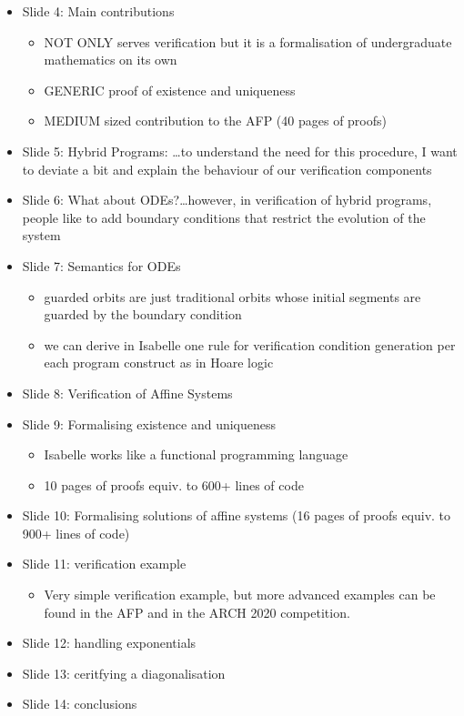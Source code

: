 \documentclass[english,letterpaper,12pt]{article}
\begin{document}
\begin{itemize}
\begin{itemize}
\end{itemize}
\item Slide 4: Main contributions
\begin{itemize}
\item NOT ONLY serves verification but it is a formalisation of undergraduate mathematics on its own 
\item GENERIC proof of existence and uniqueness
\item MEDIUM sized contribution to the AFP (40 pages of proofs)
\end{itemize}
\item Slide 5: Hybrid Programs: \dots to understand the need for this procedure, I want to deviate a bit and explain the behaviour of our verification components
\item Slide 6: What about ODEs?\dots however, in verification of hybrid programs, people like to add boundary conditions that restrict the evolution of the system
\item Slide 7: Semantics for ODEs
\begin{itemize}
\item guarded orbits are just traditional orbits whose initial segments are guarded by the boundary condition
\item we can derive in Isabelle one rule for verification condition generation per each program construct as in Hoare logic
\end{itemize}
\item Slide 8: Verification of Affine Systems
\item Slide 9: Formalising existence and uniqueness
\begin{itemize}
\item Isabelle works like a functional programming language
\item 10 pages of proofs equiv. to 600+ lines of code
\end{itemize}
\item Slide 10: Formalising solutions of affine systems (16 pages of proofs equiv. to 900+ lines of code)
\item Slide 11: verification example
\begin{itemize}
\item Very simple verification example, but more advanced examples can be found in the AFP and in the ARCH 2020 competition. 
\end{itemize}
\item Slide 12: handling exponentials
\item Slide 13: ceritfying a diagonalisation
\item Slide 14: conclusions
\end{itemize}
\end{document}

